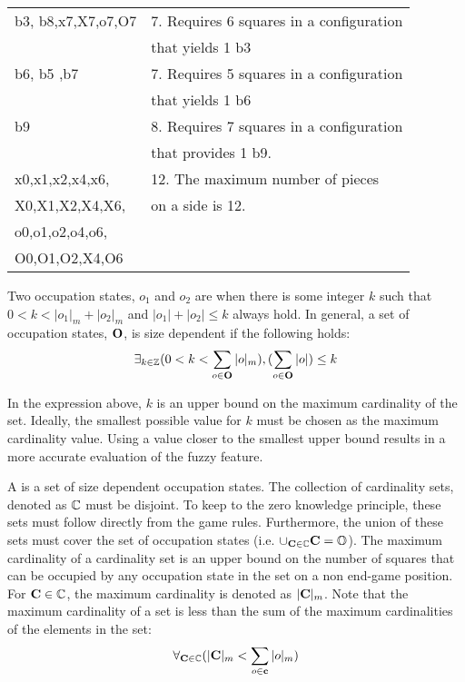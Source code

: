 \begin{table}
\begin{center}
\begin{tabular}[hbt]{|l|l|}
\hline  
b3, b8,x7,X7,o7,O7  & 7. Requires 6 squares in a configuration \\
    &  that yields 1 b3\\
\hline  
b6, b5 ,b7   & 7. Requires 5 squares in a configuration \\
    &  that yields 1 b6\\
\hline  
b9 & 8.  Requires 7 squares in a configuration \\
	& that provides 1 b9. \\     
\hline
x0,x1,x2,x4,x6, & 12.  The maximum number of pieces \\
X0,X1,X2,X4,X6,    & on a side is 12. \\
o0,o1,o2,o4,o6, & \\
O0,O1,O2,X4,O6 & \\
\hline	
\end{tabular}
\end{center}
\label{tab:mc}
\end{table}


Two occupation states, $o_1$ and $o_2$ are  when there is some integer $k$ such that  $0 < k < |o_1|_m + |o_2|_m$  and $|o_1| + |o_2| \leq k$ always hold. In general, a set of occupation states, ${\bf O}$, is size dependent if the following holds:
\[ \exists_{k \in \mathbb Z}  (0 < k < \sum_{o \in {\bf O}}|o|_m), (\sum_{o \in {\bf O}}|o|) \leq k \]

In the expression above, $k$ is an upper bound on the maximum cardinality of the set.   Ideally, the smallest possible value for $k$ must be chosen as  the maximum cardinality value.  Using a value closer to the smallest upper bound results in a more accurate evaluation of the fuzzy feature.   


A  is a set of size dependent occupation states. The collection of cardinality sets, denoted as $\mathbb{C}$ must be disjoint.  To keep to the zero knowledge principle, these sets must follow directly from the game rules.  Furthermore, the union of these sets must cover the set of occupation states (i.e. $\cup_{{\bf C} \in \mathbb{C}} {\bf C} = \mathbb{O}$). The maximum cardinality of a cardinality set is an upper bound on the number of squares that can be occupied by any occupation state in the set on a non end-game position.  For ${\bf C} \in \mathbb{C}$, the maximum cardinality is denoted as $|{\bf C}|_m$.  Note that the maximum cardinality of a set is less than the sum of the maximum cardinalities of the elements in the set:
\[
	\forall_{{\bf C} \in \mathbb{C}} (|{\bf C}|_m < \sum_{o \in {\bf c}} |o|_m)
\]


